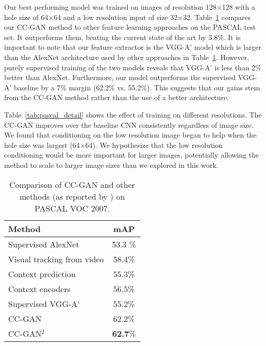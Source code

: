 \documentclass{article} \usepackage{iclr2017_conference,times}
\newcommand{\tab}[1]{Table~\ref{tab:#1}}
\begin{document}
Our best performing model was trained on images of resolution
128$\times$128 with a hole size of 64$\times$64 and a low resolution
input of size 32$\times$32.  \tab{pascal} compares our CC-GAN method
to other feature learning approaches on the PASCAL test set. It
outperforms them, beating the current state of the art \citep{wang2015} by 3.8\%. It is
important to note that our feature extractor is the VGG-A' model which
is larger than the AlexNet architecture \citep{krizhevsky2012} used by
other approaches in \tab{pascal}.  However, purely supervised training
of the two models reveals that VGG-A' is less than 2\% better than
AlexNet. Furthermore, our model outperforms the supervised VGG-A'
baseline by a 7\% margin (62.2\% vs. 55.2\%).  This suggests that our
gains stem from the CC-GAN method rather than the use of a better
architecture.


\tab{pascal_detail} shows the effect of training on different
resolutions.  The CC-GAN improves over the baseline CNN consistently
regardless of image size.  We found that conditioning on the low
resolution image began to help when the hole size was largest
(64$\times$64).  We hypothesize that the low resolution conditioning
would be more important for larger images, potentially allowing the
method to scale to larger image sizes than we explored in this work.

\begin{table}[t]
\centering
\small
\begin{tabularx}{0.7\textwidth}{l|c}
\bf{Method} & \bf{mAP}\\
\hline
\hline
Supervised AlexNet & 53.3 \%\\
Visual tracking from video \citep{wang2015} & 58.4\% \\
Context prediction \citep{doersch2015} & 55.3\%\\
Context encoders \citep{pathak2016} & 56.5\% \\
\hline
Supervised VGG-A' & 55.2\%\\
CC-GAN  & 62.2\%\\
CC-GAN$^2$  & {\bf 62.7}\%\\
\end{tabularx}
\vspace{2mm}
\caption{Comparison of CC-GAN and other methods (as reported by \cite{pathak2016}) on PASCAL VOC 2007.}
\label{tab:pascal}
\end{table}
\end{document}
